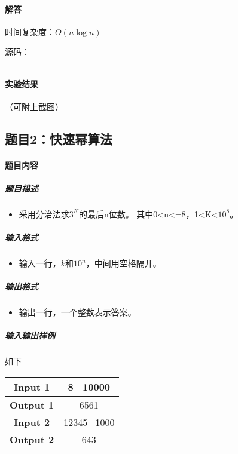 \documentclass[12pt,a4paper]{ctexart}
\begin{document}
\vspace{5pt}

\paragraph{解答} 时间复杂度：$O(n \log n)$

源码：
\inputminted[bgcolor=codebg,frame=lines,autogobble,linenos=true,breaklines]{cpp}{src/t1.cpp}

\vspace{5pt}

\paragraph{实验结果}
（可附上截图）

\newpage

\subsection*{题目2：快速幂算法}
\paragraph{题目内容}
\subparagraph{题目描述}
\begin{itemize}
    \item 采用分治法求$3^{K}$的最后n位数。 其中0<n<=8，1<K<$10^{8}$。
\end{itemize}

\subparagraph{输入格式}
    \begin{itemize}
        \item 输入一行，$k$和$10^n$，中间用空格隔开。
    \end{itemize}

\subparagraph{输出格式}
    \begin{itemize}
        \item 输出一行，一个整数表示答案。
    \end{itemize}
    
\subparagraph{输入输出样例}
如下
\begin{table}[htb]   
    \begin{center}   
    \begin{tabular}{|c|c|}   
    \hline   \textbf{Input 1} &8 \ 10000 \\   
    \hline   \textbf{Output 1} &6561 \\ 
    \hline   \textbf{Input 2} &12345 \ 1000 \\
    \hline   \textbf{Output 2} &643 \\ 
    \hline   
    \end{tabular}   
    \end{center}   
\end{table}
\end{document}
